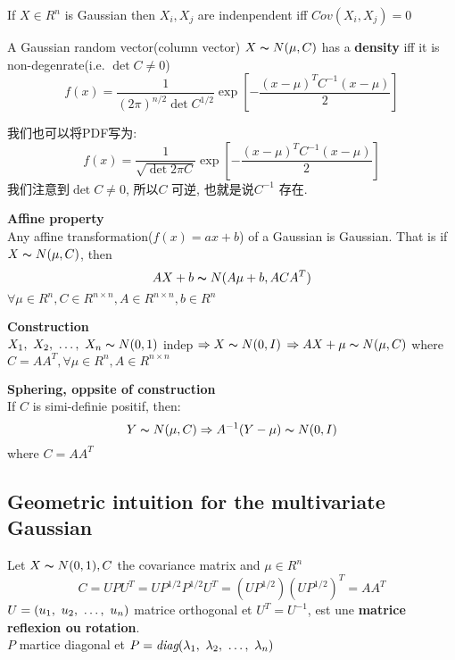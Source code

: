 \documentclass{article}
\begin{document}
\begin{theorem}
If $X \in R^n$ is Gaussian then $X_i, X_j$ are indenpendent iff $Cov(X_i, X_j) = 0$
\end{theorem}

\begin{theorem}
A Gaussian random vector(column vector) $X \thicksim{N}(\mu, C)$ has a \textbf{density} iff it is non-degenrate(i.e. $\det{C} \neq 0$)
$$
f(x) = \frac{1}{(2\pi)^{n/2} \det{C}^{1/2}} \exp[- \frac{(x - \mu)^T C^{-1} (x - \mu)}{2}]
$$
\end{theorem}
我们也可以将PDF写为:
$$
f(x) = \frac{1}{\sqrt{\det{2 \pi C}}} \exp[- \frac{(x - \mu)^T C^{-1} (x - \mu)}{2}]
$$
我们注意到$\det{C} \neq 0$, 所以$C$ 可逆, 也就是说$C^{-1}$ 存在.

\begin{theorem}
\textbf{Affine property}\\
Any affine transformation($f(x) = ax + b$) of a Gaussian is Gaussian. That is if $X \thicksim{N}(\mu, C)$, then
$$AX+b \thicksim{N}(A\mu + b, ACA^T)$$
$\forall \mu \in R^n, C \in R^{n \times n}, A \in R^{n \times n}, b \in R^n$
\end{theorem}

\begin{fact}
\textbf{Construction}\\
$X_1,~X_2,~\ldots,~X_n \thicksim{N}(0,1)$ indep $\Rightarrow X \thicksim{N}(0, I)$
$\Rightarrow AX + \mu \thicksim{N}(\mu, C)$ where $C = A A^T, \forall \mu \in R^n, A \in R^{n \times n}$
\end{fact}

\begin{fact}
\textbf{Sphering, oppsite of construction}\\
If $C$ is simi-definie positif, then:
$$Y \thicksim{N}(\mu, C) \Rightarrow A^{-1}(Y - \mu) \thicksim{N}(0,I)$$
where $C = A A^T$
\end{fact}

\subsection{Geometric intuition for the multivariate Gaussian}
Let $X \thicksim{N}(0,1), C $ the covariance matrix and $\mu \in R^n$
$$
C = U P U^T = U P^{1/2} P^{1/2} U^T = (U P^{1/2}) (U P^{1/2})^T =  A A^T
$$
$U = (u_1,~u_2,~\ldots,~u_n)$ matrice orthogonal et $U^T = U^{-1}$, est une \textbf{matrice reflexion ou rotation}.\\
$P$ martice diagonal et $P = \textit{diag}(\lambda_1,~\lambda_2,~\ldots,~\lambda_n)$
\end{document}
